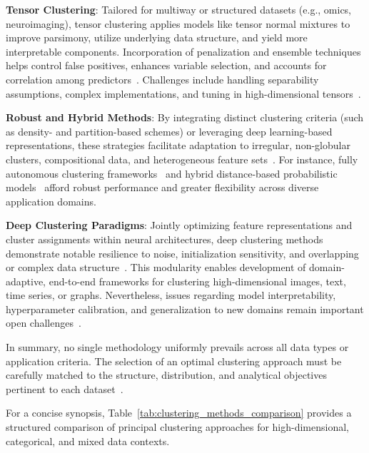 \documentclass[sigconf]{acmart}
\begin{document}
\textbf{Tensor Clustering}: Tailored for multiway or structured datasets (e.g., omics, neuroimaging), tensor clustering applies models like tensor normal mixtures to improve parsimony, utilize underlying data structure, and yield more interpretable components. Incorporation of penalization and ensemble techniques helps control false positives, enhances variable selection, and accounts for correlation among predictors~\cite{ref39,ref57,ref58,ref116,ref100}. Challenges include handling separability assumptions, complex implementations, and tuning in high-dimensional tensors~\cite{ref58,ref100}.

\textbf{Robust and Hybrid Methods}: By integrating distinct clustering criteria (such as density- and partition-based schemes) or leveraging deep learning-based representations, these strategies facilitate adaptation to irregular, non-globular clusters, compositional data, and heterogeneous feature sets~\cite{ref22,ref36,ref38,ref39,ref61,ref62,ref63,ref64,ref65,ref67,ref69,ref71,ref97,ref100,ref116,ref117}. For instance, fully autonomous clustering frameworks~\cite{ref62} and hybrid distance-based probabilistic models~\cite{ref57} afford robust performance and greater flexibility across diverse application domains.

\textbf{Deep Clustering Paradigms}: Jointly optimizing feature representations and cluster assignments within neural architectures, deep clustering methods demonstrate notable resilience to noise, initialization sensitivity, and overlapping or complex data structure~\cite{ref22,ref38,ref64,ref65,ref67,ref116}. This modularity enables development of domain-adaptive, end-to-end frameworks for clustering high-dimensional images, text, time series, or graphs. Nevertheless, issues regarding model interpretability, hyperparameter calibration, and generalization to new domains remain important open challenges~\cite{ref22,ref65,ref67,ref116}.

In summary, no single methodology uniformly prevails across all data types or application criteria. The selection of an optimal clustering approach must be carefully matched to the structure, distribution, and analytical objectives pertinent to each dataset~\cite{ref16,ref22,ref90,ref97,ref116,ref117}.

For a concise synopsis, Table~\ref{tab:clustering_methods_comparison} provides a structured comparison of principal clustering approaches for high-dimensional, categorical, and mixed data contexts.
\end{document}
